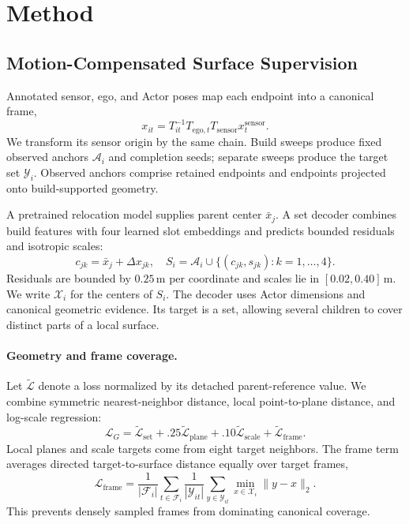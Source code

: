 \section{Method}
\label{sec:method}


\subsection{Motion-Compensated Surface Supervision}

Annotated sensor, ego, and Actor poses map each endpoint into a canonical frame,
\begin{equation}
x_{it}=T_{it}^{-1}T_{\mathrm{ego},t}T_{\mathrm{sensor}}x_t^{\mathrm{sensor}}.
\end{equation}
We transform its sensor origin by the same chain. Build sweeps produce fixed observed anchors $\mathcal A_i$
and completion seeds; separate sweeps produce the target set $\mathcal Y_i$.
Observed anchors comprise retained endpoints and endpoints projected onto build-supported geometry.

A pretrained relocation model supplies parent center $\bar x_j$. A set decoder combines build features with
four learned slot embeddings and predicts bounded residuals and isotropic scales:
\begin{equation}
c_{jk}=\bar x_j+\Delta x_{jk},\quad
S_i=\mathcal A_i\cup\{(c_{jk},s_{jk}):k=1,\ldots,4\}.
\label{eq:child-surface}
\end{equation}
Residuals are bounded by $0.25$\,m per coordinate and scales lie in $[0.02,0.40]$\,m.
We write $\mathcal X_i$ for the centers of $S_i$.
The decoder uses Actor dimensions and canonical geometric evidence. Its target is a set, allowing several
children to cover distinct parts of a local surface.

\paragraph{Geometry and frame coverage.}
Let $\widetilde{\mathcal L}$ denote a loss normalized by its detached parent-reference value.
We combine symmetric nearest-neighbor distance, local point-to-plane distance, and log-scale regression:
\begin{equation}
\mathcal L_G=\widetilde{\mathcal L}_{\mathrm{set}}
+.25\widetilde{\mathcal L}_{\mathrm{plane}}
+.10\widetilde{\mathcal L}_{\mathrm{scale}}
+\widetilde{\mathcal L}_{\mathrm{frame}}.
\label{eq:physical-loss}
\end{equation}
Local planes and scale targets come from eight target neighbors. The frame term averages directed
target-to-surface distance equally over target frames,
\begin{equation}
\mathcal L_{\mathrm{frame}}=
\frac{1}{|\mathcal F_i|}\sum_{t\in\mathcal F_i}
\frac{1}{|\mathcal Y_{it}|}\sum_{y\in\mathcal Y_{it}}\min_{x\in\mathcal X_i}\|y-x\|_2.
\label{eq:frame-loss}
\end{equation}
This prevents densely sampled frames from dominating canonical coverage.

